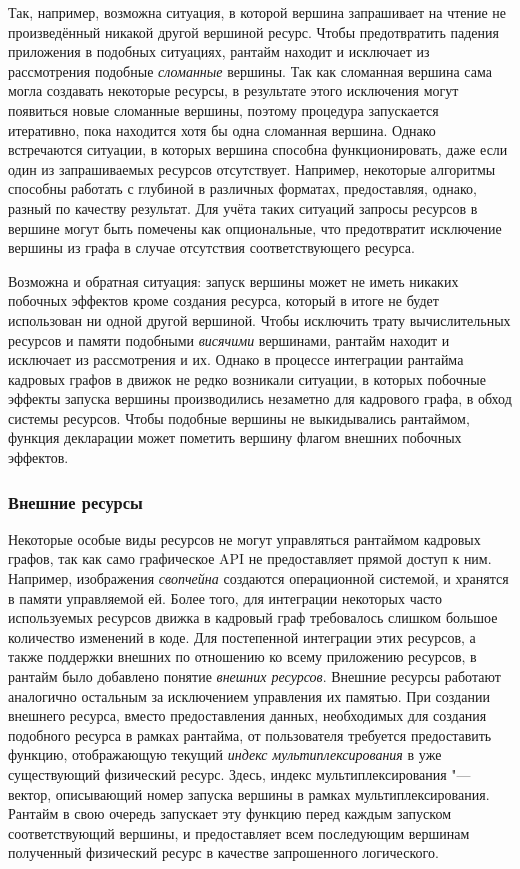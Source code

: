 Так, например, возможна ситуация, в которой вершина запрашивает на чтение не произведённый никакой другой вершиной ресурс.
Чтобы предотвратить падения приложения в подобных ситуациях, рантайм находит и исключает из рассмотрения подобные \textit{сломанные} вершины.
Так как сломанная вершина сама могла создавать некоторые ресурсы, в результате этого исключения могут появиться новые сломанные вершины, поэтому процедура запускается итеративно, пока находится хотя бы одна сломанная вершина.
Однако встречаются ситуации, в которых вершина способна функционировать, даже если один из запрашиваемых ресурсов отсутствует.
Например, некоторые алгоритмы способны работать с глубиной в различных форматах, предоставляя, однако, разный по качеству результат.
Для учёта таких ситуаций запросы ресурсов в вершине могут быть помечены как опциональные, что предотвратит исключение вершины из графа в случае отсутствия соответствующего ресурса.

Возможна и обратная ситуация: запуск вершины может не иметь никаких побочных эффектов кроме создания ресурса, который в итоге не будет использован ни одной другой вершиной.
Чтобы исключить трату вычислительных ресурсов и памяти подобными \textit{висячими} вершинами, рантайм находит и исключает из рассмотрения и их.
Однако в процессе интеграции рантайма кадровых графов в движок не редко возникали ситуации, в которых побочные эффекты запуска вершины производились незаметно для кадрового графа, в обход системы ресурсов.
Чтобы подобные вершины не выкидывались рантаймом, функция декларации может пометить вершину флагом внешних побочных эффектов.

\subsubsection{Внешние ресурсы}
Некоторые особые виды ресурсов не могут управляться рантаймом кадровых графов, так как само графическое API не предоставляет прямой доступ к ним.
Например, изображения \textit{свопчейна} создаются операционной системой, и хранятся в памяти управляемой ей.
Более того, для интеграции некоторых часто используемых ресурсов движка в кадровый граф требовалось слишком большое количество изменений в коде.
Для постепенной интеграции этих ресурсов, а также поддержки внешних по отношению ко всему приложению ресурсов, в рантайм было добавлено понятие \textit{внешних ресурсов}.
Внешние ресурсы работают аналогично остальным за исключением управления их памятью.
При создании внешнего ресурса, вместо предоставления данных, необходимых для создания подобного ресурса в рамках рантайма, от пользователя требуется предоставить функцию, отображающую текущий \textit{индекс мультиплексирования} в уже существующий физический ресурс.
Здесь, индекс мультиплексирования "--- вектор, описывающий номер запуска вершины в рамках мультиплексирования.
Рантайм в свою очередь запускает эту функцию перед каждым запуском соответствующий вершины, и предоставляет всем последующим вершинам полученный физический ресурс в качестве запрошенного логического.


